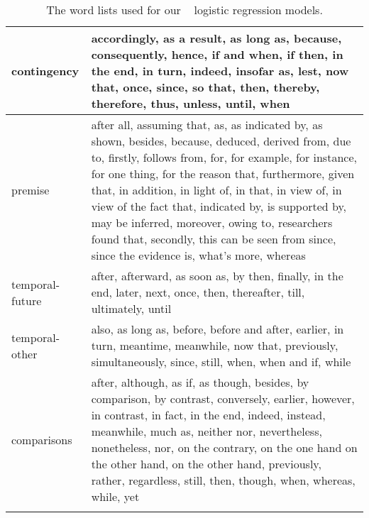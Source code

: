 \begin{longtable}{p{2 cm}  p{12cm} }
	\hline
	contingency  & accordingly, as a result, as long as, because, consequently, hence, if and when, if then, in the end, in turn, indeed, insofar as, lest, now that, once, since, so that, then, thereby, therefore, thus, unless, until, when\\
	\hline
	premise  & after all, assuming that, as, as indicated by, as shown, besides, because, deduced, derived from, due to, firstly, follows from, for, for example, for instance, for one thing, for the reason that, furthermore, given that, in addition, in light of, in that, in view of, in view of the fact that, indicated by, is supported by, may be inferred, moreover, owing to, researchers found that, secondly, this can be seen from since, since the evidence is, what's more, whereas\\
	\hline
	temporal-future & after, afterward, as soon as, by then, finally, in the end, later, next, once, then, thereafter, till, ultimately, until\\
	\hline
	temporal-other  & also, as long as, before, before and after, earlier, in turn, meantime, meanwhile, now that, previously, simultaneously, since, still, when, when and if, while\\
	\hline
	comparisons & after, although, as if, as though, besides, by comparison, by contrast, conversely, earlier, however, in contrast, in fact, in the end, indeed, instead, meanwhile, much as, neither nor, nevertheless, nonetheless, nor, on the contrary, on the one hand on the other hand, on the other hand, previously, rather, regardless, still, then, though, when, whereas, while, yet\\
	\bottomrule
	\caption{The word lists used for our \wordlist{}~\cite{niculaelinguistic} logistic regression models.} \label{tab:wordfeatures}
\end{longtable}
\clearpage
\twocolumn


